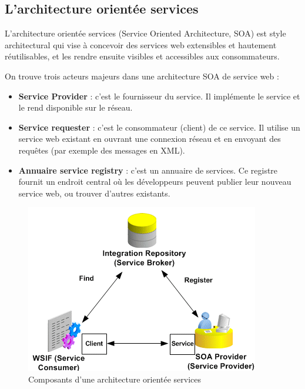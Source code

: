 \subsection{L'architecture orientée services} 
L'architecture orientée services (Service Oriented Architecture, SOA) est style architectural qui vise à concevoir des services web extensibles et hautement réutilisables, et les rendre ensuite visibles et accessibles aux consommateurs.
				
On trouve trois acteurs majeurs dans une architecture SOA de service web :
\begin{itemize}
	\item \textbf{Service Provider} : 
	      c'est le fournisseur du service. Il implémente le service et le rend disponible sur le réseau.
	\item \textbf{Service requester} :
	      c'est le consommateur (client) de ce service. Il utilise un service web existant en ouvrant une connexion réseau et en envoyant des requêtes (par exemple des messages en XML).
	\item \textbf{Annuaire service registry} : 
	      c'est un annuaire de services. Ce registre fournit un endroit central où les développeurs peuvent publier leur nouveau service web, ou trouver d'autres existants.\newline 
\end{itemize}

\begin{figure}[h]
	\center
	\includegraphics[scale=0.71]{img/SOA.png}
	\caption{Composants d'une architecture orientée services}		
	\centering
\end{figure}		

